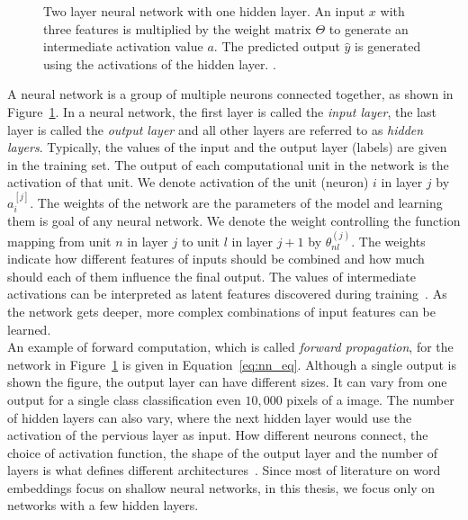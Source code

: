 \begin{figure}
\centering 
\resizebox{0.75\textwidth}{0.45\textwidth}{      

}
\caption{Two layer neural network with one hidden layer. An input $x$ with three features is multiplied by the weight matrix $\Theta$ to generate an intermediate activation value $a$. The predicted output $\hat { y } $ is generated using the activations of the hidden layer.  \protect \footnotemark .}

\label{fig:nn}

\end{figure}
\noindent
A neural network is a group of multiple neurons connected together, as shown in Figure~\ref{fig:nn}. In a neural network, the first layer is called the \emph{input layer}, the last layer is called the \emph{output layer} and all other layers are referred to as \emph{hidden layers}.
Typically, the values of the input and the output layer (labels) are given in the training set. The output of each computational unit in the network is the activation of that unit. We denote activation of the unit (neuron) $i$ in layer $j$ by $a_{i}^{[j]}$. The weights of the network are the parameters of the model and learning them is goal of any neural network. We denote the weight controlling the function mapping from unit $n$ in layer $j$ to unit $l$ in layer $j+1$ by
$\theta^{(j)}_{nl}$. The weights indicate how different features of inputs should be combined and how much should each of them influence the final output. The values of intermediate activations can be interpreted as latent features discovered during training~. As the network gets deeper, more complex combinations of input features can be learned. \\
An example of forward computation, which is called \emph{forward propagation}, for the network in Figure~\ref{fig:nn} is given in Equation~\ref{eq:nn_eq}. Although a single output is shown the figure, the output layer can have different sizes. It can vary from one output for a single class classification even $10,000$ pixels of a image. The number of hidden layers can also vary, where the next hidden layer would use the activation of the pervious layer as input. How different neurons connect, the choice of activation function, the shape of the output layer and the number of layers is what defines different architectures~. Since most of literature on word embeddings focus on shallow neural networks, in this thesis, we focus only on networks with a few hidden layers. 
